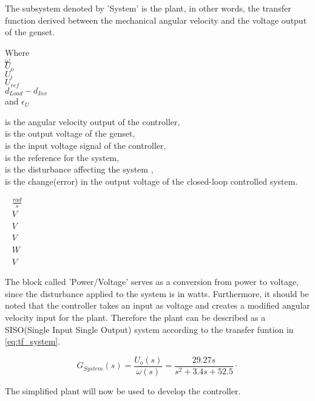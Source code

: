 The subsystem denoted by 'System' is the plant, in other words, the transfer function derived between the mechanical angular velocity and the voltage output of the genset.


\begin{minipage}[t]{0.20\textwidth}
Where\\
\hspace*{8mm} $\omega$ \\
\hspace*{8mm} $U_o$ \\
\hspace*{8mm} $U_i$ \\
\hspace*{8mm} $U_{ref}$ \\
\hspace*{8mm} $d_{Load}-d_{Inv}$ \\
\hspace*{8mm} and $\epsilon_U$ 
\end{minipage}
\begin{minipage}[t]{0.68\textwidth}
\vspace*{2mm}
is the angular velocity output of the controller,\\
is the output voltage of the genset, \\
is the input voltage signal of the controller, \\
is the reference for the system, \\
is the disturbance affecting the system , \\
is the change(error) in the output voltage of the closed-loop controlled system. 

\end{minipage}
\begin{minipage}[t]{0.10\textwidth}
\vspace*{2mm}
\textcolor{White}{te}$\unit{\frac{rad}{s}}$\\
\textcolor{White}{te}$\unit{V}$\\
\textcolor{White}{te}$\unit{V}$\\
\textcolor{White}{te}$\unit{V}$\\
\textcolor{White}{te}$\unit{W}$\\
\textcolor{White}{te}$\unit{V}$
\end{minipage}

The block called 'Power/Voltage' serves as a conversion from power to voltage, since the disturbance applied to the system is in watts. Furthermore, it should be noted that the controller takes an input as voltage and creates a modified angular velocity input for the plant. Therefore the plant can be described as a SISO(Single Input Single Output) system according to the transfer funtion in \eqref{eq:tf_system}. 

\begin{equation}
\label{eq:tf_system}
G_{System}(s) = \frac{U_o(s)}{\omega(s)} = \frac {29.27s}{s^2 + 3.4s + 52.5} \unit{\cdot}
\end{equation}

The simplified plant will now be used to develop the controller. 
  

